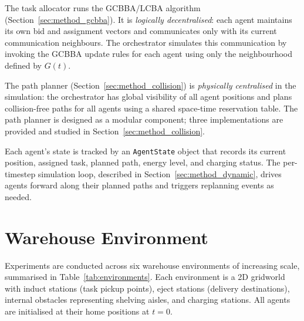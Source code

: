 The task allocator runs the GCBBA/LCBA algorithm (Section~\ref{sec:method_gcbba}).
It is \emph{logically decentralised}: each agent maintains its own bid and
assignment vectors and communicates only with its current communication
neighbours.
The orchestrator simulates this communication by invoking the GCBBA update
rules for each agent using only the neighbourhood defined by $G(t)$.

The path planner (Section~\ref{sec:method_collision}) is \emph{physically
centralised} in the simulation: the orchestrator has global visibility of
all agent positions and plans collision-free paths for all agents using
a shared space-time reservation table.
The path planner is designed as a modular component; three implementations are
provided and studied in Section~\ref{sec:method_collision}.

Each agent's state is tracked by an \texttt{AgentState} object that records
its current position, assigned task, planned path, energy level, and charging
status.
The per-timestep simulation loop, described in
Section~\ref{sec:method_dynamic}, drives agents forward along their planned
paths and triggers replanning events as needed.


\section{Warehouse Environment}
\label{sec:method_environment}

Experiments are conducted across six warehouse environments of increasing scale,
summarised in Table~\ref{tab:environments}.
Each environment is a 2D gridworld with induct stations (task pickup points),
eject stations (delivery destinations), internal obstacles representing shelving
aisles, and charging stations.
All agents are initialised at their home positions at $t = 0$.

